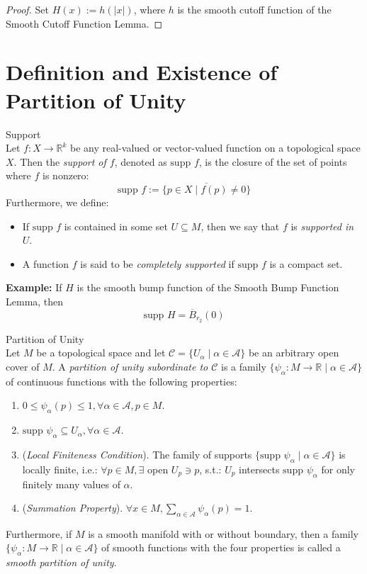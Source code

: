 \begin{proof}
    Set $H(x):= h(|x|)$, where $h$ is the smooth cutoff function of the Smooth Cutoff Function Lemma.
\end{proof}

\section{Definition and Existence of Partition of Unity}

\begin{definition}{Support}\\
Let $f:X\to \mathbb{R}^k$ be any real-valued or vector-valued function on a topological space $X$. Then the \textit{support of $f$}, denoted as $\text{supp }f$, is the closure of the set of points where $f$ is nonzero:
\[
\text{supp }f:= \overline{\{ p\in X\mid f(p)\neq 0\}}
\]
Furthermore, we define:
\begin{itemize}
    \item If $\text{supp }f$ is contained in some set $U\subseteq M$, then we say that $f$ is \textit{supported in $U$}.

    \item A function $f$ is said to be \textit{completely supported} if $\text{supp }f$ is a compact set.
\end{itemize}
\end{definition}


\noindent\textbf{Example:} If $H$ is the smooth bump function of the Smooth Bump Function Lemma, then
\[
\text{supp }H= \overline{B}_{r_2} (0)
\]

\begin{definition}{Partition of Unity}\\
Let $M$ be a topological space and let $\mathcal{C}= \{U_\alpha \mid \alpha \in \mathcal{A}\}$ be an arbitrary open cover of $M$. A \textit{partition of unity subordinate to $\mathcal{C}$} is a family $\{\psi_\alpha :M\to \mathbb{R} \mid \alpha \in \mathcal{A}\}$ of continuous functions with the following properties:
\begin{enumerate}
    \item $0\leq \psi_\alpha (p) \leq 1 ,\forall \alpha \in \mathcal{A}, p\in M$.
    \item $\text{supp } \psi_\alpha \subseteq U_\alpha ,\forall \alpha\in \mathcal{A}$.
    \item (\textit{Local Finiteness Condition}). The family of supports $\{\text{supp }\psi_ \alpha\mid \alpha\in \mathcal{A} \}$ is locally finite, i.e.: $\forall p\in M,\exists$ open $U_p\ni p$, s.t.: $U_p$ intersects $\text{supp }\psi_\alpha$ for only finitely many values of $\alpha$.

    \item (\textit{Summation Property}). $\forall x\in M, \sum_{\alpha\in \mathcal{A}} \psi_\alpha(p)=1$.
\end{enumerate}
Furthermore, if $M$ is a smooth manifold with or without boundary, then a family $\{\psi_\alpha :M\to \mathbb{R} \mid \alpha\in \mathcal{A} \}$ of smooth functions with the four properties is called a \textit{smooth partition of unity}.
\end{definition}

